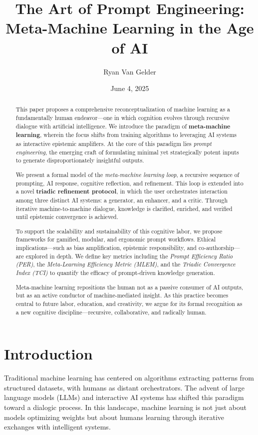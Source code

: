 \documentclass{article}
\title{The Art of Prompt Engineering: Meta-Machine Learning in the Age of AI}
\author{Ryan Van Gelder}
\date{June 4, 2025}
\begin{document}
\maketitle

\begin{abstract}
This paper proposes a comprehensive reconceptualization of machine learning as a fundamentally human endeavor—one in which cognition evolves through recursive dialogue with artificial intelligence. We introduce the paradigm of \textbf{meta-machine learning}, wherein the focus shifts from training algorithms to leveraging AI systems as interactive epistemic amplifiers. At the core of this paradigm lies \textit{prompt engineering}, the emerging craft of formulating minimal yet strategically potent inputs to generate disproportionately insightful outputs.

We present a formal model of the \textit{meta-machine learning loop}, a recursive sequence of prompting, AI response, cognitive reflection, and refinement. This loop is extended into a novel \textbf{triadic refinement protocol}, in which the user orchestrates interaction among three distinct AI systems: a generator, an enhancer, and a critic. Through iterative machine-to-machine dialogue, knowledge is clarified, enriched, and verified until epistemic convergence is achieved.

To support the scalability and sustainability of this cognitive labor, we propose frameworks for gamified, modular, and ergonomic prompt workflows. Ethical implications—such as bias amplification, epistemic responsibility, and co-authorship—are explored in depth. We define key metrics including the \textit{Prompt Efficiency Ratio (PER)}, the \textit{Meta-Learning Efficiency Metric (MLEM)}, and the \textit{Triadic Convergence Index (TCI)} to quantify the efficacy of prompt-driven knowledge generation.

Meta-machine learning repositions the human not as a passive consumer of AI outputs, but as an active conductor of machine-mediated insight. As this practice becomes central to future labor, education, and creativity, we argue for its formal recognition as a new cognitive discipline—recursive, collaborative, and radically human.
\end{abstract}
\newpage

\section{Introduction}
Traditional machine learning has centered on algorithms extracting patterns from structured datasets, with humans as distant orchestrators. The advent of large language models (LLMs) and interactive AI systems has shifted this paradigm toward a dialogic process. In this landscape, machine learning is not just about models optimizing weights but about humans learning through iterative exchanges with intelligent systems.
\end{document}
